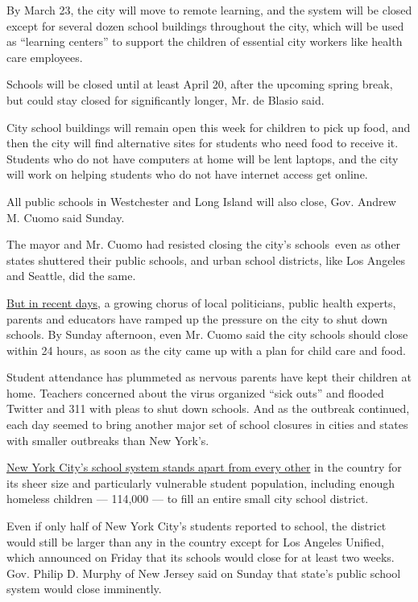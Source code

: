 By March 23, the city will move to remote learning, and the system will
be closed except for several dozen school buildings throughout the city,
which will be used as ``learning centers'' to support the children of
essential city workers like health care employees.

Schools will be closed until at least April 20, after the upcoming
spring break, but could stay closed for significantly longer, Mr. de
Blasio said.

City school buildings will remain open this week for children to pick up
food, and then the city will find alternative sites for students who
need food to receive it. Students who do not have computers at home will
be lent laptops, and the city will work on helping students who do not
have internet access get online.

All public schools in Westchester and Long Island will also close, Gov.
Andrew M. Cuomo said Sunday.

The mayor and Mr. Cuomo had resisted closing the city's schools~even as
other states shuttered their public schools, and urban school districts,
like Los Angeles and Seattle, did the same.

\href{https://www.nytimes3xbfgragh.onion/2020/03/13/nyregion/coronavirus-nyc-schools.html}{But
in recent days}, a growing chorus of local politicians, public health
experts, parents and educators have ramped up the pressure on the city
to shut down schools. By Sunday afternoon, even Mr. Cuomo said the city
schools should close within 24 hours, as soon as the city came up with a
plan for child care and food.

Student attendance has plummeted as nervous parents have kept their
children at home. Teachers concerned about the virus organized ``sick
outs'' and flooded Twitter and 311 with pleas to shut down schools. And
as the outbreak continued, each day seemed to bring another major set of
school closures in cities and states with smaller outbreaks than New
York's.

\href{https://www.nytimes3xbfgragh.onion/2020/03/07/nyregion/nyc-schools-coronavirus.html}{New
York City's school system stands apart from every other} in the country
for its sheer size and particularly vulnerable student population,
including enough homeless children --- 114,000 --- to fill an entire
small city school district.

Even if only half of New York City's students reported to school, the
district would still be larger than any in the country except for Los
Angeles Unified, which announced on Friday that its schools would close
for at least two weeks. Gov. Philip D. Murphy of New Jersey said on
Sunday that state's public school system would close imminently.

